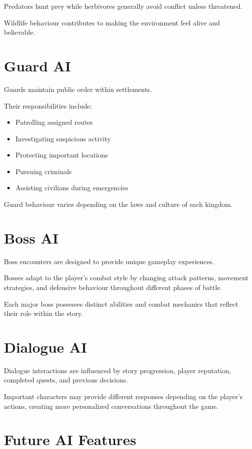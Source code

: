 Predators hunt prey while herbivores generally avoid conflict unless threatened.

Wildlife behaviour contributes to making the environment feel alive and believable.

\section{Guard AI}

Guards maintain public order within settlements.

Their responsibilities include:

\begin{itemize}
    \item Patrolling assigned routes
    \item Investigating suspicious activity
    \item Protecting important locations
    \item Pursuing criminals
    \item Assisting civilians during emergencies
\end{itemize}

Guard behaviour varies depending on the laws and culture of each kingdom.

\section{Boss AI}

Boss encounters are designed to provide unique gameplay experiences.

Bosses adapt to the player's combat style by changing attack patterns, movement strategies, and defensive behaviour throughout different phases of battle.

Each major boss possesses distinct abilities and combat mechanics that reflect their role within the story.

\section{Dialogue AI}

Dialogue interactions are influenced by story progression, player reputation, completed quests, and previous decisions.

Important characters may provide different responses depending on the player's actions, creating more personalized conversations throughout the game.

\section{Future AI Features}

